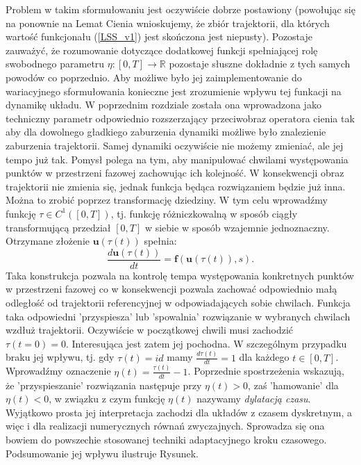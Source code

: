 \documentclass[12pt]{article}
\begin{document}
Problem w takim sformułowaniu jest oczywiście dobrze postawiony (powołując się na ponownie na Lemat Cienia wnioskujemy, że zbiór trajektorii, dla których wartość funkcjonału (\ref{LSS_v1}) jest skończona jest niepusty). Pozostaje zauważyć, że rozumowanie dotyczące dodatkowej funkcji spełniającej rolę swobodnego parametru $ \eta: [0,T] \rightarrow \mathbb{R} $ pozostaje słuszne dokładnie z tych samych powodów co poprzednio. Aby możliwe było jej zaimplementowanie do wariacyjnego sformułowania konieczne jest zrozumienie wpływu tej funkacji na dynamikę układu. W poprzednim rozdziale została ona wprowadzona jako techniczny parametr odpowiednio rozszerzający przeciwobraz operatora cienia tak aby dla dowolnego gładkiego zaburzenia dynamiki możliwe było znalezienie zaburzenia trajektorii. Samej dynamiki oczywiście nie możemy zmieniać, ale jej tempo już tak. Pomysł polega na tym, aby manipulować chwilami występowania punktów w przestrzeni fazowej zachowując ich kolejność. W konsekwencji obraz trajektorii nie zmienia się, jednak funkcja będąca rozwiązaniem będzie już inna. Można to zrobić poprzez transformację dziedziny. W tym celu wprowadźmy funkcję $ \tau \in C^{1}([0,T]) $, tj. funkcję różniczkowalną w sposób ciągły transformującą przedział $ [0,T] $ w siebie w sposób wzajemnie jednoznaczny. Otrzymane złożenie $ \textbf{u}(\tau(t)) $ spełnia:
\begin{equation}
\frac{d\textbf{u}(\tau (t))}{dt} = \textbf{f}(\textbf{u}(\tau(t)), s).
\label{LSS_v2}
\end{equation}  
Taka konstrukcja pozwala na kontrolę tempa występowania konkretnych punktów w przestrzeni fazowej co w konsekwencji pozwala zachować odpowiednio małą odległość od trajektorii referencyjnej w odpowiadających sobie chwilach. \newline
Funkcja taka odpowiedni 'przyspiesza' lub 'spowalnia' rozwiązanie w wybranych chwilach wzdłuż trajektorii. Oczywiście w początkowej chwili musi zachodzić $ \tau(t=0) = 0 $. Interesująca jest zatem jej pochodna. W szczególnym przypadku braku jej wpływu, tj. gdy $ \tau(t) = id $ mamy $ \frac{d\tau(t)}{dt} = 1$ dla każdego $ t \in [0,T] $. Wprowadźmy oznaczenie $ \eta(t) = \frac{\tau(t)}{dt}-1 $. Poprzednie spostrzeżenia wskazują, że 'przyspieszanie' rozwiązania następuje przy $ \eta(t) > 0$, zaś 'hamowanie' dla  $ \eta(t) < 0$, w związku z czym funkcję $ \eta(t) $ nazywamy \textit{dylatacją czasu}.\newline
Wyjątkowo prosta jej interpretacja zachodzi dla układów z czasem dyskretnym, a więc i dla realizacji numerycznych równań zwyczajnych. Sprowadza się ona bowiem do powszechie stosowanej techniki adaptacyjnego kroku czasowego. Podsumowanie jej wpływu ilustruje Rysunek.
\end{document}
